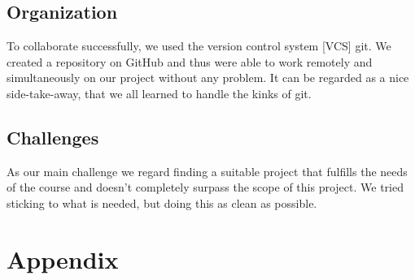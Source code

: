 \documentclass[11pt,a4paper,notitlepage]{article}
\begin{document}
\subsection*{Organization}
To collaborate successfully, we used the version control system [VCS] git. We created a repository on GitHub and thus were able to work remotely and simultaneously on our project without any problem. It can be regarded as a nice side-take-away, that we all learned to handle the kinks of git. 

\subsection*{Challenges}
As our main challenge we regard finding a suitable project that fulfills the needs of the course and doesn't completely surpass the scope of this project. We tried sticking to what is needed, but doing this as clean as possible.

\section*{Appendix}
\end{document}
